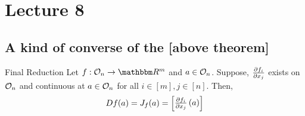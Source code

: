 \documentclass[../Analysis-3]{subfiles}
\begin{document}
\chapter*{Lecture 8} %
\setcounter{chapter}{8} %
\setcounter{section}{0}

\section{A kind of converse of the [above theorem]}

\begin{Thm}{Final Reduction}{}\label{thm:finalred}
  Let $ f :\Op{n} \to \R^m $ and $ a \in \mathcal{O}_{n} $. Suppose, $ \pdv{f_i}{x_j} $ exists on $ \mathcal{O}_{n} $ and continuous at $ a \in \mathcal{O}_{n} $ for all $ i\in [m], j\in [n] $. Then,
  \begin{align*}
    Df(a) = J_{f}(a) = \begin{bmatrix}
                         \pdv{f_i}{x_j}\left( a \right)
                       \end{bmatrix}
  \end{align*}
\end{Thm}
\end{document}
